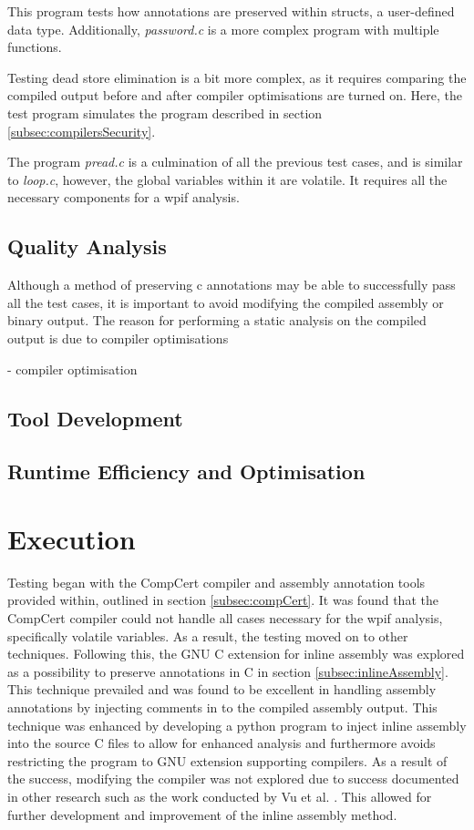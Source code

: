 This program tests how annotations are preserved within structs, a user-defined data type. Additionally, \textit{password.c} is a more complex program with multiple functions.

Testing dead store elimination is a bit more complex, as it requires comparing the compiled output before and after compiler optimisations are turned on. Here, the test program simulates the program described in section \ref{subsec:compilersSecurity}.

The program \textit{pread.c} is a culmination of all the previous test cases, and is similar to \textit{loop.c}, however, the global variables within it are volatile. It requires all the necessary components for a wpif analysis.

\subsection{Quality Analysis}
\label{subsec:qualityAnalysis}
Although a method of preserving c annotations may be able to successfully pass all the test cases, it is important to avoid modifying the compiled assembly or binary output. The reason for performing a static analysis on the compiled output is due to compiler optimisations 

- compiler optimisation

\subsection{Tool Development}
\label{subsec:toolDevelopment}

\subsection{Runtime Efficiency and Optimisation}
\label{subsec:runtimeEfficiencyOptimisation}



\clearpage
\section{Execution}
Testing began with the CompCert compiler and assembly annotation tools provided within, outlined in section \ref{subsec:compCert}. It was found that the CompCert compiler could not handle all cases necessary for the wpif analysis, specifically volatile variables. As a result, the testing moved on to other techniques. Following this, the GNU C extension for inline assembly was explored as a possibility to preserve annotations in C in section \ref{subsec:inlineAssembly}. This technique prevailed and was found to be excellent in handling assembly annotations by injecting comments in to the compiled assembly output. This technique was enhanced by developing a python program to inject inline assembly into the source C files to allow for enhanced analysis and furthermore avoids restricting the program to GNU extension supporting compilers. As a result of the success, modifying the compiler was not explored due to success documented in other research such as the work conducted by Vu et al. \cite{vu2020secure}. This allowed for further development and improvement of the inline assembly method.

